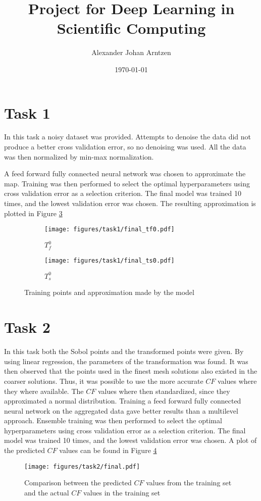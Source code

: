 \documentclass[a4paper]{article}
\title{Project for Deep Learning in Scientific Computing}
\author{Alexander Johan Arntzen }
\date{\today}
\begin{document}
\maketitle

\section*{Task 1}
In this task a noisy dataset was provided. Attempts to denoise the data did not produce a better cross validation error, so no denoising was used. All the data was then normalized by min-max normalization.

A feed forward fully connected neural network was chosen to approximate the map. Training was then performed to select the optimal hyperparameters using cross validation error as a selection criterion. The final model was trained 10 times, and the lowest validation error was chosen. The resulting approximation is plotted in Figure \ref{fig:task1}

\begin{figure}[b]
  \begin{subfigure}[b]{0.5\textwidth}
    \centering
    \texttt{[image: figures/task1/final\_tf0.pdf]}
    \caption{$T_f^0$}
    \label{fig:task1a}
  \end{subfigure}
  \begin{subfigure}[b]{0.5\textwidth}
    \centering
    \texttt{[image: figures/task1/final\_ts0.pdf]}
    \caption{$T_s^0$}
    \label{fig:task1b}
  \end{subfigure}
  \caption{Training points and approximation made by the model}
  \label{fig:task1}
  \end{figure}

\section*{Task 2}
In this task both the Sobol points and the transformed points were given. By using linear regression, the parameters of the transformation was found. It was then observed that the points used in the finest mesh solutions also existed in the coarser solutions. Thus, it was possible to use the more accurate $CF$ values where they where available. The $CF$ values where then standardized, since they approximated a normal distribution. 
Training a feed forward fully connected neural network on the aggregated data gave better results than a multilevel\cite{lye2020multilevel} approach. Ensemble training was then performed to select the optimal hyperparameters using cross validation error as a selection criterion. The final model was trained 10 times, and the lowest validation error was chosen. A plot of the predicted $CF$ values can be found in Figure \ref{fig:task2}  
\begin{figure}[ht]
    \centering
    \texttt{[image: figures/task2/final.pdf]}
    \caption{Comparison between the predicted $CF$ values from the training set and the actual $CF$ values in the training set}
    \label{fig:task2}
\end{figure}
\end{document}
